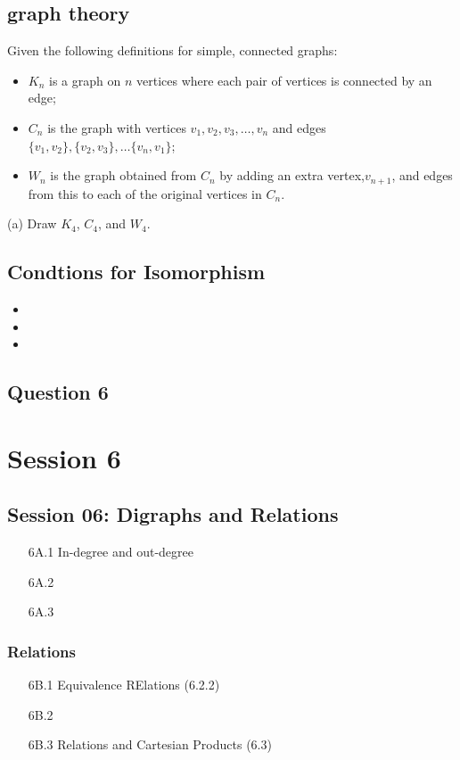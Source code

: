 \documentclass[]{report}
\begin{document}
\section{graph theory }
Given the following definitions for simple, connected graphs:
\begin{itemize}
	\item $K_n$ is a graph on $n$ vertices where each pair of vertices is connected by an edge;
	\item $C_n$ is the graph with vertices $v_1, v_2, v_3, \dots, v_n$ and edges $\{v_1,v_2\}, \{v_2,v_3\}, \dots\{v_n, v_1\}$;
	\item $W_n$ is the graph obtained from $C_n$ by adding an extra vertex,$v_{n+1}$, and edges
	from this to each of the original vertices in $C_n$.
\end{itemize}
(a) Draw $K_4$, $C_4$, and $W_4$. 
\newpage
\section*{Condtions for Isomorphism}
\begin{itemize}
	\item
	\item
	\item
\end{itemize}

\section*{Question 6}

\chapter{Session 6}
\section*{Session 06: Digraphs and Relations}
\begin{itemize}
	\item[6A.1] In-degree and out-degree
	\item[6A.2]
	\item[6A.3]
\end{itemize}
\subsection*{Relations}
\begin{itemize}
	\item[6B.1] Equivalence RElations (6.2.2)
	\item[6B.2]
	\item[6B.3] Relations and Cartesian Products (6.3)
\end{itemize}
\end{document}
